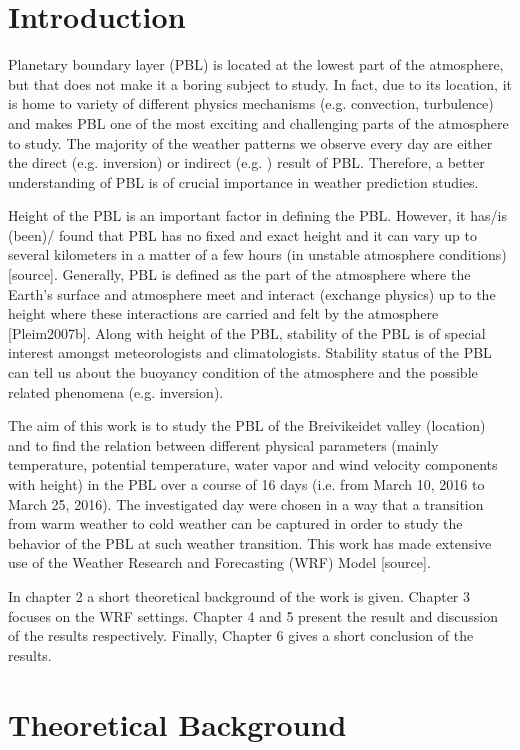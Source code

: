 \documentclass[a4paper,12pt]{article}
\numberwithin{equation}{section} %
\begin{document}
\section{Introduction}

Planetary boundary layer (PBL) is located at the lowest part of the atmosphere, but that does not make it a boring subject to study. In fact, due to its location, it is home to variety of different physics mechanisms (e.g. convection, turbulence) and makes PBL one of the most exciting and challenging parts of the atmosphere to study. The majority of the weather patterns we observe every day are either the direct (e.g. inversion) or indirect (e.g. ) result of PBL. Therefore, a better understanding of PBL is of crucial importance in weather prediction studies. 

Height of the PBL is an important factor in defining the PBL. However, it has/is (been)/ found that PBL has no fixed and exact height and it can vary up to several kilometers in a matter of a few hours (in unstable atmosphere conditions) [source]. Generally, PBL is defined as the part of the atmosphere where the Earth's surface and atmosphere meet and interact (exchange physics) up to the height where these interactions are carried and felt by the atmosphere [Pleim2007b]. Along with height of the PBL, stability of the PBL is of special interest amongst meteorologists and climatologists. Stability status of the PBL can tell us about the buoyancy condition of the atmosphere and the possible related phenomena (e.g. inversion).

The aim of this work is to study the PBL of the Breivikeidet valley (location) and to find the relation between different physical parameters (mainly temperature, potential temperature, water vapor and wind velocity components with height) in the PBL over a course of 16 days (i.e. from March 10, 2016 to March 25, 2016). The investigated day were chosen in a way that a transition from warm weather to cold weather can be captured in order to study the behavior of the PBL at such weather transition. This work has made extensive use of the Weather Research and Forecasting (WRF) Model [source].

In chapter 2 a short theoretical background of the work is given. Chapter 3 focuses on the WRF settings. Chapter 4 and 5 present the result and discussion of the results respectively. Finally, Chapter 6 gives a short conclusion of the results.

\newpage

\section{Theoretical Background}
\end{document}
